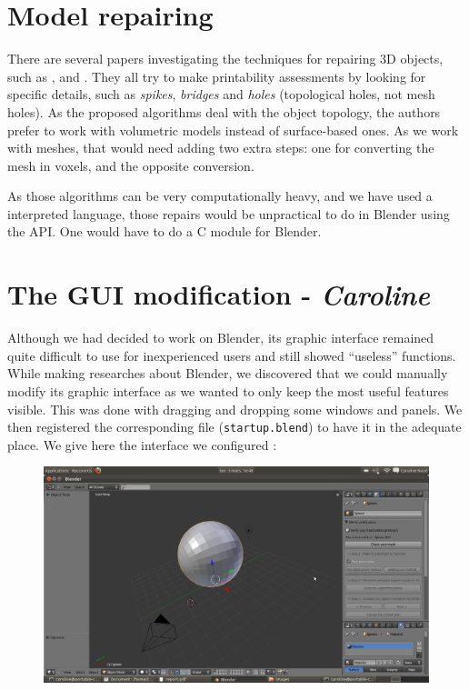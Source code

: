 \documentclass{report}
\begin{document}
\section{Model repairing}\label{sec:repairing}

There are several papers investigating the techniques for repairing 3D objects, such as \cite{volum_simp}, \cite{printability} and \cite{noise_removal}. They all try to make printability assessments by looking for specific details, such as \emph{spikes}, \emph{bridges} and \emph{holes} (topological holes, not mesh holes). As the proposed algorithms deal with the object topology, the authors prefer to work with volumetric models instead of surface-based ones. As we work with meshes, that would need adding two extra steps: one for converting the mesh in voxels, and the opposite conversion.

As those algorithms can be very computationally heavy, and we have used a interpreted language, those repairs would be unpractical to do in Blender using the API. One would have to do a C module for Blender.

\section{The GUI modification - \textit{Caroline}}\label{sec:gui-modif}

Although we had decided to work on Blender, its graphic interface remained quite difficult to use for inexperienced users and still showed ``useless'' functions. \\
While making researches about Blender, we discovered that we could manually modify its graphic interface as we wanted to only keep the most useful features visible. This was done with dragging and dropping some windows and panels. We then registered the corresponding file (\texttt{startup.blend}) to have it in the adequate place. We give here the interface we configured :

\bigskip
\bigskip

\begin{figure}[!h]
\begin{center}
	\includegraphics[scale=0.3]{NotreInterface}
\end{center}
\end{figure}
\end{document}
